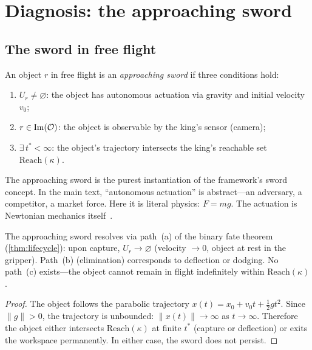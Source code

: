 \section{Diagnosis: the approaching sword}
\label{sec:c-diagnosis}

\subsection{The sword in free flight}

\begin{definition}
\label{def:c-sword}
An object $r$ in free flight is an \emph{approaching sword} if
three conditions hold:
\begin{enumerate}[label=(\roman*),nosep]
  \item $U_r \neq \varnothing$: the object has autonomous actuation
  via gravity and initial velocity $v_0$;
  \item $r \in \mathrm{Im}(\mathcal{O})$: the object is observable by the
  king's sensor (camera);
  \item $\exists\, t^* < \infty$: the object's trajectory intersects
  the king's reachable set $\mathrm{Reach}(\kappa)$.
\end{enumerate}
\end{definition}

The approaching sword is the purest instantiation of the framework's
sword concept.  In the main text, ``autonomous actuation'' is
abstract---an adversary, a competitor, a market force.  Here it is
literal physics: $F = mg$.  The actuation is Newtonian mechanics
itself~\cite{newton}.

\begin{proposition}
\label{prop:c-lifecycle}
The approaching sword resolves via path~(a) of the binary fate
theorem (\cref{thm:lifecycle}): upon capture, $U_r \to \varnothing$
(velocity $\to 0$, object at rest in the gripper).  Path~(b)
(elimination) corresponds to deflection or dodging.  No path~(c)
exists---the object cannot remain in flight indefinitely within
$\mathrm{Reach}(\kappa)$.
\end{proposition}

\begin{proof}
The object follows the parabolic trajectory
$x(t) = x_0 + v_0 t + \frac{1}{2}g t^2$.  Since $\|g\| > 0$,
the trajectory is unbounded: $\|x(t)\| \to \infty$ as
$t \to \infty$.  Therefore the object either intersects
$\mathrm{Reach}(\kappa)$ at finite $t^*$ (capture or deflection)
or exits the workspace permanently.  In either case, the sword
does not persist.
\end{proof}

